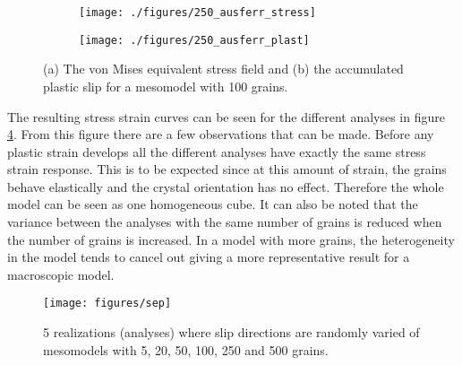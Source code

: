 \documentclass[crystal_plast.tex]{subfiles}
\begin{document}
\begin{figure}[htpb!]
\centering
\begin{subfigure}{.8\textwidth}
  \centering
  \texttt{[image: ./figures/250\_ausferr\_stress]}
  \caption{}
  \label{fig:ausferr_stress}
\end{subfigure}%

\begin{subfigure}{.8\textwidth}
  \centering
  \texttt{[image: ./figures/250\_ausferr\_plast]}
  \caption{}
  \label{fig:ausferr_plast}
\end{subfigure}
\caption{(a) The von Mises equivalent stress field and (b) the accumulated plastic slip for a mesomodel with 100 grains.}
\label{fig:ausferr_col}
\end{figure}


The resulting stress strain curves can be seen for the different analyses in figure \ref{fig:sep}. From this figure there are a few observations that can be made. Before any plastic strain develops all the different analyses have exactly the same stress strain response. This is to be expected since at this amount of strain, the grains behave elastically and the crystal orientation has no effect. Therefore the whole model can be seen as one homogeneous cube. It can also be noted that the variance between the analyses with the same number of grains is reduced when the number of grains is increased. In a model with more grains, the heterogeneity in the model tends to cancel out giving a more representative result for a macroscopic model.


 \begin{figure}[ht]
\centering
\texttt{[image: figures/sep]}
\caption{5 realizations (analyses) where slip directions are randomly varied of mesomodels with 5, 20, 50, 100, 250 and 500 grains.}
\label{fig:sep}
\end{figure}
\end{document}
